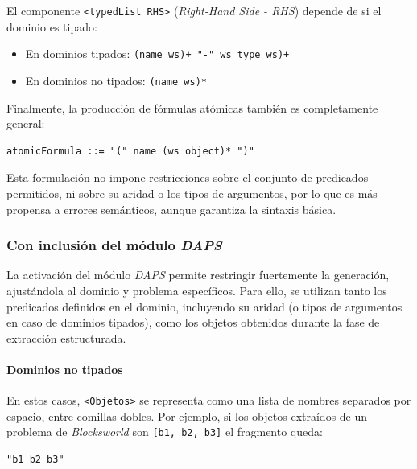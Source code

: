 El componente \texttt{<typedList RHS>} (\textit{Right-Hand Side - RHS}) depende de si el dominio es tipado:
\begin{itemize}
    \item En dominios tipados: \texttt{(name ws)+ "-" ws type ws)+}
    \item En dominios no tipados: \texttt{(name ws)*}
\end{itemize}

Finalmente, la producción de fórmulas atómicas también es completamente general:

\begin{tcolorbox}[colback=blue!5!white, colframe=blue!75!black, title=Producción de fórmula atómica sin \textit{DAPS}, fonttitle=\bfseries, breakable]
\small
\begin{verbatim}
atomicFormula ::= "(" name (ws object)* ")"
\end{verbatim}
\end{tcolorbox}

Esta formulación no impone restricciones sobre el conjunto de predicados permitidos, ni sobre su aridad o los tipos de argumentos, por lo que es más propensa a errores semánticos, aunque garantiza la sintaxis básica.

\subsubsection{Con inclusión del módulo \textit{DAPS}}

La activación del módulo \textit{DAPS} permite restringir fuertemente la generación, ajustándola al dominio y problema específicos. Para ello, se utilizan tanto los predicados definidos en el dominio, incluyendo su aridad (o tipos de argumentos en caso de dominios tipados), como los objetos obtenidos durante la fase de extracción estructurada.

\paragraph{Dominios no tipados}

En estos casos, \texttt{<Objetos>} se representa como una lista de nombres separados por espacio, entre comillas dobles. Por ejemplo, si los objetos extraídos de un problema de \textit{Blocksworld} son \texttt{[b1, b2, b3]} el fragmento queda:

\begin{tcolorbox}[colback=white, colframe=gray, title=Ejemplo de fragmento \texttt{<Objetos>} no tipado con \textit{DAPS}, fonttitle=\bfseries, breakable]
\small
\begin{verbatim}
"b1 b2 b3"
\end{verbatim}
\end{tcolorbox}

